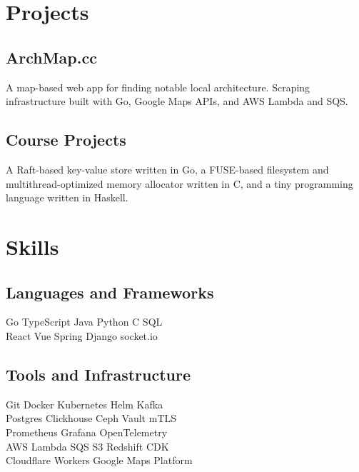 \documentclass[]{deedy-resume}
\begin{document}
\begin{minipage}[t]{0.5\textwidth}
\section{Projects}
\subsection{ArchMap.cc}
A map-based web app for finding notable local architecture. Scraping infrastructure built with Go, Google Maps APIs, and AWS Lambda and SQS.
\sectionsep
\subsection{Course Projects}
A Raft-based key-value store written in Go, a FUSE-based filesystem and multithread-optimized memory allocator written in C, and a tiny programming language written in Haskell.
\end{minipage}\hfill\begin{minipage}[t]{0.45\textwidth}
\section{Skills}
\subsection{Languages and Frameworks}
Go \textbullet{} TypeScript \textbullet{} Java \textbullet{} Python \textbullet{} C \textbullet{} SQL \\
React \textbullet{} Vue \textbullet{} Spring \textbullet{} Django \textbullet{} socket.io
\sectionsep
\subsection{Tools and Infrastructure}
Git \textbullet{} Docker \textbullet{} Kubernetes \textbullet{} Helm \textbullet{} Kafka \\
Postgres \textbullet{} Clickhouse \textbullet{} Ceph \textbullet{} Vault \textbullet{} mTLS \\
Prometheus \textbullet{} Grafana \textbullet{} OpenTelemetry \\
AWS Lambda \textbullet{} SQS \textbullet{} S3 \textbullet{} Redshift \textbullet{} CDK \\
Cloudflare Workers \textbullet{} Google Maps Platform
\end{minipage}
\end{document}
